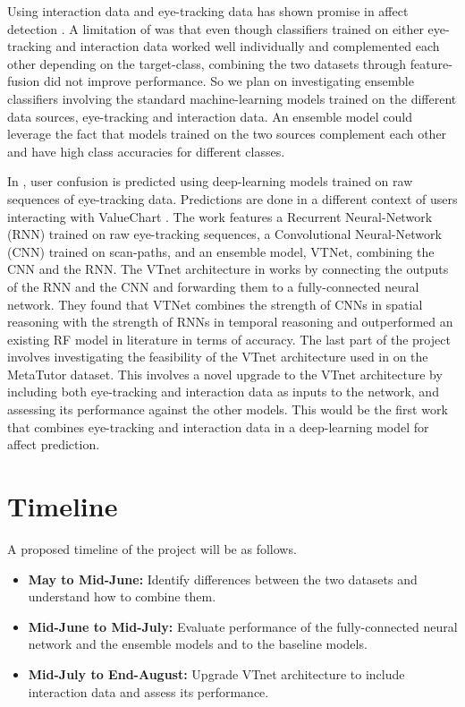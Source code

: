 \documentclass[10pt,letterpaper]{article}
\begin{document}
Using interaction data and eye-tracking data has shown promise in affect detection \autocite{lalle2016predicting, lalle2021predict}. A limitation of \autocite{lalle2021predict} was that even though classifiers trained on either eye-tracking and interaction data worked well individually and complemented each other depending on the target-class, combining the two datasets through feature-fusion did not improve performance. So we plan on investigating ensemble classifiers involving the standard machine-learning models trained on the different data sources, eye-tracking and interaction data. An ensemble model could leverage the fact that models trained on the two sources complement each other and have high class accuracies for different classes.

In \cite{sims2020neural}, user confusion is predicted using deep-learning models trained on raw sequences of eye-tracking data. Predictions are done in a different context of users interacting with ValueChart \autocite{carenini2004valuecharts}. The work features a Recurrent Neural-Network (RNN) trained on raw eye-tracking sequences, a Convolutional Neural-Network (CNN) trained on scan-paths, and an ensemble model, VTNet, combining the CNN and the RNN. The VTnet architecture in \cite{sims2020neural} works by connecting the outputs of the RNN and the CNN and forwarding them to a fully-connected neural network. They found that VTNet combines the strength of CNNs in spatial reasoning with the strength of RNNs in temporal reasoning and outperformed an existing RF model in literature \autocite{lalle2016predicting} in terms of accuracy.
The last part of the project involves investigating the feasibility of the VTnet architecture used in \cite{sims2020neural} on the MetaTutor dataset. This involves a novel upgrade to the VTnet architecture by including both eye-tracking and interaction data as inputs to the network, and assessing its performance against the other models. This would be the first work that combines eye-tracking and interaction data in a deep-learning model for affect prediction.

\section{Timeline}

A proposed timeline of the project will be as follows.

\begin{itemize}
    \item \textbf{May to Mid-June:} Identify differences between the two datasets and understand how to combine them.

    \item \textbf{Mid-June to Mid-July:} Evaluate performance of the fully-connected neural network and the ensemble models and to the baseline models.

    \item \textbf{Mid-July to End-August:} Upgrade VTnet architecture to include interaction data and assess its performance.

\end{itemize}

\printbibliography
\end{document}
